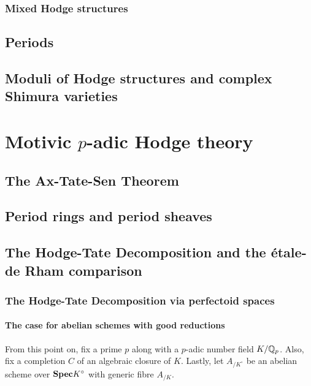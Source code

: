             \subsubsection{Mixed Hodge structures}
        
        \subsection{Periods}
        
        \subsection{Moduli of Hodge structures and complex Shimura varieties}
        
    \section{Motivic \texorpdfstring{$p$}{}-adic Hodge theory}
        \subsection{The Ax-Tate-Sen Theorem}
        
        \subsection{Period rings and period sheaves}
    
        \subsection{The Hodge-Tate Decomposition and the \'etale-de Rham comparison}
            \subsubsection{The Hodge-Tate Decomposition via perfectoid spaces}
                \paragraph{The case for abelian schemes with good reductions}
                    \begin{convention}
                        From this point on, fix a prime $p$ along with a $p$-adic number field $K/\mathbb{Q}_p$. Also, fix a completion $C$ of an algebraic closure of $K$. Lastly, let $A_{/K^{\circ}}$ be an abelian scheme over $\mathbf{Spec} K^{\circ}$ with generic fibre $A_{/K}$.
                    \end{convention}
                
